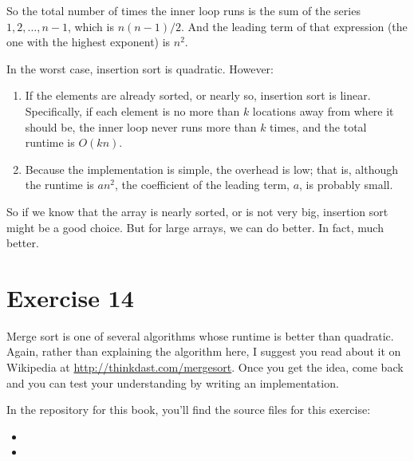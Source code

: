 \documentclass[12pt]{book}
\theoremstyle{exercise}
\begin{document}
So the total number of times the inner loop runs is the sum of the
series $1, 2, \ldots , n-1$, which is $n (n-1) / 2$. And the
leading term of that expression (the one with the highest exponent) is
$n^2$.


In the worst case, insertion sort is quadratic. However:

\begin{enumerate}

\item
  If the elements are already sorted, or nearly so, insertion sort is
  linear. Specifically, if each element is no more than $k$
  locations away from where it should be, the inner loop never runs more
  than $k$ times, and the total runtime is $O(kn)$.

\item
  Because the implementation is simple, the overhead is low; that is,
  although the runtime is $a n^2$, the coefficient of the leading
  term, $a$, is probably small.

\end{enumerate}

So if we know that the array is nearly sorted, or is not very big,
insertion sort might be a good choice. But for large arrays, we can
do better. In fact, much better.


\section{Exercise 14}
\label{exercise14}

Merge sort is one of several algorithms whose runtime is better than
quadratic. Again, rather than explaining the algorithm here, I suggest
you read about it on Wikipedia at
\url{http://thinkdast.com/mergesort}.  Once you get the idea, come
back and you can test your understanding by writing an implementation.


In the repository for this book, you'll find the source files for this
exercise:

\begin{itemize}

\item

\item

\end{itemize}
\end{document}
